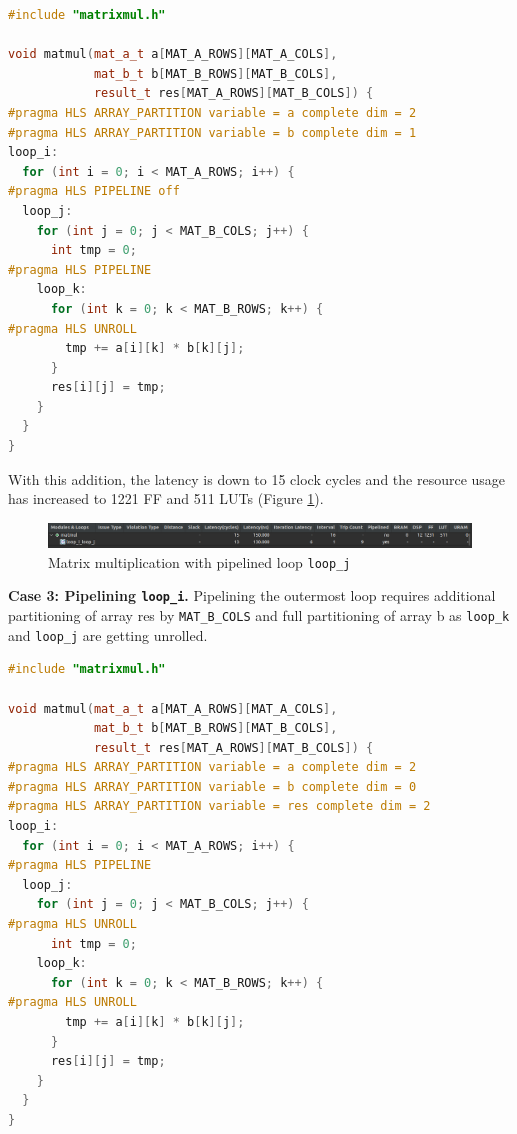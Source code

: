\documentclass[a4paper, twoside]{report}
\theoremstyle{definition}
\numberwithin{equation}{section}
\begin{document}
\begin{lstlisting}[language=c++,numbers=none]
#include "matrixmul.h"

void matmul(mat_a_t a[MAT_A_ROWS][MAT_A_COLS],
            mat_b_t b[MAT_B_ROWS][MAT_B_COLS],
            result_t res[MAT_A_ROWS][MAT_B_COLS]) {
#pragma HLS ARRAY_PARTITION variable = a complete dim = 2
#pragma HLS ARRAY_PARTITION variable = b complete dim = 1
loop_i:
  for (int i = 0; i < MAT_A_ROWS; i++) {
#pragma HLS PIPELINE off
  loop_j:
    for (int j = 0; j < MAT_B_COLS; j++) {
      int tmp = 0;
#pragma HLS PIPELINE
    loop_k:
      for (int k = 0; k < MAT_B_ROWS; k++) {
#pragma HLS UNROLL
        tmp += a[i][k] * b[k][j];
      }
      res[i][j] = tmp;
    }
  }
}
\end{lstlisting}

With this addition, the latency is down to 15 clock cycles and the resource usage
has increased to 1221 FF and 511 LUTs (Figure \ref{fig:matmul_pipej_synth}).

\begin{figure}[h!]
    \centering
    \includegraphics[width=\textwidth]{matmul_pipej_synth.png}
    \caption{Matrix multiplication with pipelined loop \texttt{loop\_j}}
    \label{fig:matmul_pipej_synth}
\end{figure}

\textbf{Case 3: Pipelining \texttt{loop\_i}.} Pipelining the outermost loop requires
additional partitioning of array res by \texttt{MAT\_B\_COLS} and full partitioning
of array b as \texttt{loop\_k} and \texttt{loop\_j} are getting unrolled.

\begin{lstlisting}[language=c++,numbers=none]
#include "matrixmul.h"

void matmul(mat_a_t a[MAT_A_ROWS][MAT_A_COLS],
            mat_b_t b[MAT_B_ROWS][MAT_B_COLS],
            result_t res[MAT_A_ROWS][MAT_B_COLS]) {
#pragma HLS ARRAY_PARTITION variable = a complete dim = 2
#pragma HLS ARRAY_PARTITION variable = b complete dim = 0
#pragma HLS ARRAY_PARTITION variable = res complete dim = 2
loop_i:
  for (int i = 0; i < MAT_A_ROWS; i++) {
#pragma HLS PIPELINE
  loop_j:
    for (int j = 0; j < MAT_B_COLS; j++) {
#pragma HLS UNROLL
      int tmp = 0;
    loop_k:
      for (int k = 0; k < MAT_B_ROWS; k++) {
#pragma HLS UNROLL
        tmp += a[i][k] * b[k][j];
      }
      res[i][j] = tmp;
    }
  }
}
\end{lstlisting}
\end{document}
